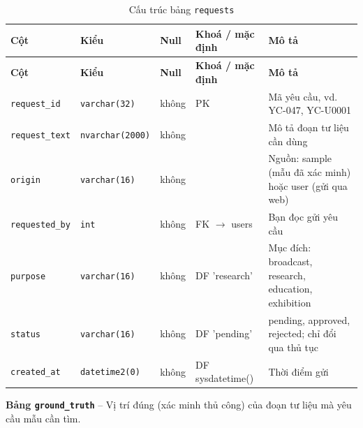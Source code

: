 \setlength{\tabcolsep}{4pt}
\begin{longtable}{>{\raggedright\arraybackslash}p{}>{\raggedright\arraybackslash}p{}>{\centering\arraybackslash}p{}>{\raggedright\arraybackslash}p{}>{\raggedright\arraybackslash}p{}}
\caption{Cấu trúc bảng \texttt{requests}}\label{tab:col_requests}\\
\toprule \textbf{Cột} & \textbf{Kiểu} & \textbf{Null} & \textbf{Khoá / mặc định} & \textbf{Mô tả} \\ \midrule \endfirsthead
\toprule \textbf{Cột} & \textbf{Kiểu} & \textbf{Null} & \textbf{Khoá / mặc định} & \textbf{Mô tả} \\ \midrule \endhead
\bottomrule \endfoot
\texttt{request\_id} & {\footnotesize\texttt{varchar(32)}} & không & PK & Mã yêu cầu, vd. YC-047, YC-U0001 \\
\texttt{request\_text} & {\footnotesize\texttt{nvarchar(2000)}} & không &  & Mô tả đoạn tư liệu cần dùng \\
\texttt{origin} & {\footnotesize\texttt{varchar(16)}} & không &  & Nguồn: sample (mẫu đã xác minh) hoặc user (gửi qua web) \\
\texttt{requested\_by} & {\footnotesize\texttt{int}} & không & FK $\rightarrow$ users & Bạn đọc gửi yêu cầu \\
\texttt{purpose} & {\footnotesize\texttt{varchar(16)}} & không & DF 'research' & Mục đích: broadcast, research, education, exhibition \\
\texttt{status} & {\footnotesize\texttt{varchar(16)}} & không & DF 'pending' & pending, approved, rejected; chỉ đổi qua thủ tục \\
\texttt{created\_at} & {\footnotesize\texttt{datetime2(0)}} & không & DF sysdatetime() & Thời điểm gửi \\
\end{longtable}

\textbf{Bảng \texttt{ground\_truth}} -- Vị trí đúng (xác minh thủ công) của đoạn tư liệu mà yêu cầu mẫu cần tìm.

